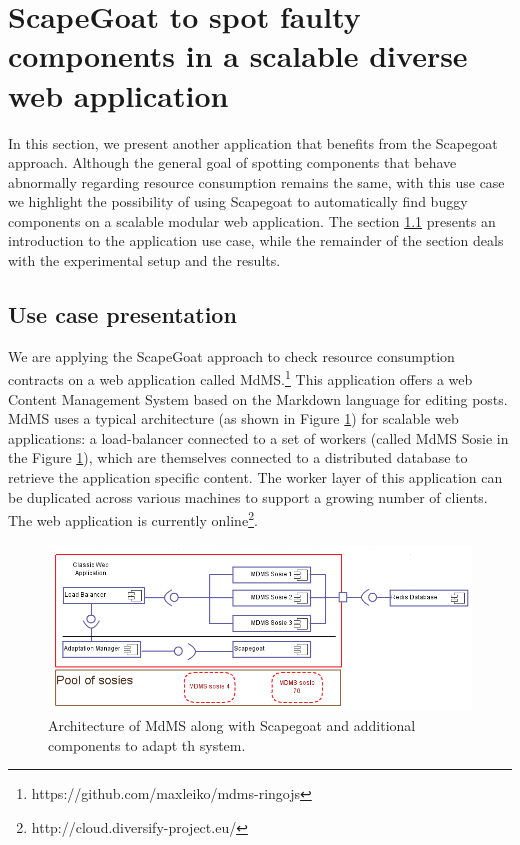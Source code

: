 \section{ScapeGoat to spot faulty components in a scalable diverse web application}\label{sec:WebStudy}
In this section, we present another application that benefits from the Scapegoat approach.
Although the general goal of spotting components that behave abnormally regarding resource consumption remains the same, with this use case we highlight the possibility of using Scapegoat 
to automatically find buggy components on a scalable modular web application.
The section \ref{MdMS} presents an introduction to the application use case, while the remainder of the section deals with the experimental setup and the results.


\subsection{Use case presentation}\label{MdMS}
We are applying the ScapeGoat approach to check resource consumption contracts on a web application called MdMS.\footnote{https://github.com/maxleiko/mdms-ringojs}
This application offers a web Content Management System based on the Markdown language for editing posts. 
MdMS uses a typical architecture (as shown in Figure \ref{fig:webapp}) for scalable web applications: a load-balancer connected to a set of workers (called MdMS Sosie in the Figure \ref{fig:webapp}), which are themselves connected to a distributed database to retrieve the application specific content.
The worker layer of this application can be duplicated across various machines to support a growing number of clients.
The web application is currently online\footnote{http://cloud.diversify-project.eu/}. 

\begin{figure}[!bt]
	\centering
	\includegraphics[scale=0.45]{chapter5/figures/webapp}
	\caption{\label{fig:webapp}Architecture of MdMS along with Scapegoat and additional components to adapt th system.}
\end{figure}

